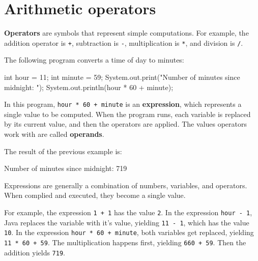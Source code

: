 \documentclass[12pt]{book}
\theoremstyle{exercise}
\newcommand{\java}[1]{\verb"#1"}
\begin{document}
\section{Arithmetic operators}
\label{sec:arithops}



{\bf Operators} are symbols that represent simple computations.
For example, the addition operator is \java{+}, subtraction is \java{-}, multiplication is \java{*}, and division is \java{/}.

The following program converts a time of day to minutes:

\begin{code}
    int hour = 11;
    int minute = 59;
    System.out.print("Number of minutes since midnight: ");
    System.out.println(hour * 60 + minute);
\end{code}


In this program, \java{hour * 60 + minute} is an {\bf expression}, which represents a single value to be computed.
When the program runs, each variable is replaced by its current value, and then the operators are applied.
The values operators work with are called {\bf operands}.

The result of the previous example is:

\begin{stdout}
Number of minutes since midnight: 719
\end{stdout}

Expressions are generally a combination of numbers, variables, and operators.
When complied and executed, they become a single value.

For example, the expression \java{1 + 1} has the value \java{2}.
In the expression \java{hour - 1}, Java replaces the variable with it's value, yielding \java{11 - 1}, which has the value \java{10}.
In the expression \java{hour * 60 + minute}, both variables get replaced, yielding \java{11 * 60 + 59}.
The multiplication happens first, yielding \java{660 + 59}.
Then the addition yields \java{719}.
\end{document}
